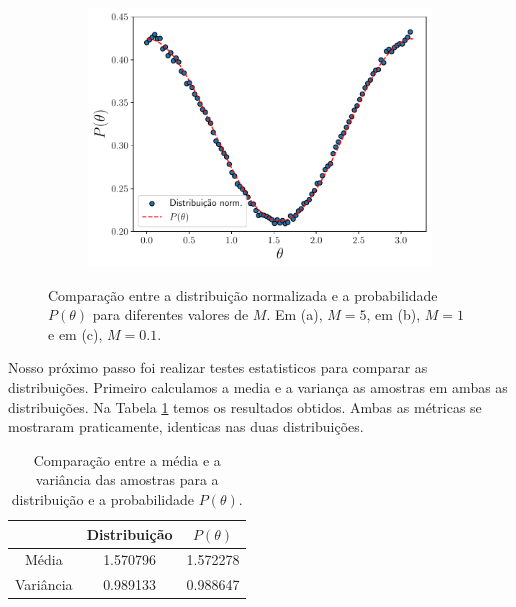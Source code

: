 \documentclass[a4paper, 12pt]{article}
\begin{document}
\begin{figure}[!htb]
    \vspace{0.2cm} %
    \begin{subfigure}{0.48\textwidth}
        \centering
        \includegraphics[width=\linewidth]{distribuicao_theta_0.1.pdf}
        \caption{}
      
    \end{subfigure}

    \caption{Comparação entre a distribuição normalizada e a probabilidade \(P(\theta)\) para 
    diferentes valores de \(M\). Em (a), \(M = 5\), em (b), \(M = 1\) e em (c), \(M = 0.1\).} 
    \label{f4}

\end{figure}

Nosso próximo passo foi realizar testes estatisticos para comparar as distribuições. Primeiro 
calculamos a media e a variança as amostras em ambas as distribuições. Na Tabela \ref{t3} temos
os resultados obtidos. Ambas as métricas se mostraram praticamente, identicas nas duas distribuições.

\begin{table}
    \centering
    \begin{tabular}{|c|c|c|}
        \hline
        & Distribuição & \(P(\theta)\) \\
        \hline
        Média & 1.570796 & 1.572278 \\
        Variância & 0.989133 & 0.988647 \\
        \hline
    \end{tabular}
    \caption{Comparação entre a média e a variância das amostras para a distribuição e a probabilidade \(P(\theta)\).}
    \label{t3}
\end{table}
\end{document}
